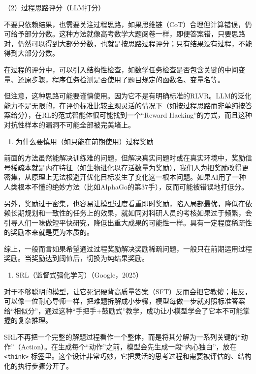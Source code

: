 （2）过程思路评分（LLM打分）

不要只依赖结果，也需要关注过程思路，如果思维链（CoT）合理但计算错误，仍可给予部分分数。这种方法就像高考数学大题阅卷一样，即便答案错，只要思路对，仍然可以得到大部分分数，也就是按思路过程评分；只有结果没有过程，不能得到大部分分数。

在过程的评分中，可以引入结构性检查，如数学任务检查是否包含关键的中间变量、还原步骤，程序任务检测是否使用了题目规定的函数名、变量名等。

但注意，这种思路可能要谨慎使用。因为它不是有明确标准的RLVR。LLM的泛化能力不是无限的，在评价标准比较主观灵活的情况下（如按过程思路而非单纯按答案给分），在RL的范式智能体很可能找到一个``Reward Hacking''的方式，而且这种对抗性样本的漏洞不可能全部被完美堵上。

\begin{enumerate}
\def\labelenumi{\arabic{enumi}.}
\setcounter{enumi}{1}
\tightlist
\item
  为什么要慎用（如只能在前期使用）过程奖励
\end{enumerate}

前面的方法虽然能解决训练难的问题，但解决真实问题时或在真实环境中，奖励信号稀疏本就是内在特征（如生物进化以存活数量为奖励），我们人为把奖励改得更密集，从原理上无法根避开优化目标发生了变化这一根本问题。如果AI用了一种人类根本不懂的绝妙方法（比如AlphaGo的第37手），反而可能被错误地打低分。

另外，奖励过于密集，也容易让模型过度看重即时奖励，陷入局部最优，降低在依赖长期规划和一致性的任务上的效果，就如同对科研人员的考核如果过于频繁，会引导人们一味做短平快研究，降低出重大成果的可能性一样。具有一定程度稀疏性的奖励本来就是更为本质的。

综上，一般而言如果希望通过过程奖励解决奖励稀疏问题，一般只在前期运用过程奖励。当奖励达到阈值后，切换为纯结果奖励。

\begin{enumerate}
\def\labelenumi{\arabic{enumi}.}
\setcounter{enumi}{1}
\tightlist
\item
  SRL（监督式强化学习）（Google，2025）
\end{enumerate}

对于不够聪明的模型，让它死记硬背高质量答案（SFT）反而会把它教傻；相反，可以像一位耐心导师一样，把难题拆解成小步骤，模型每做一步就对照标准答案给``相似分''，通过这种``手把手+鼓励式''教学，成功让小模型学会了它本不可能掌握的复杂推理。

SRL不再把一个完整的解题过程看作一个整体，而是将其分解为一系列关键的``动作''（Action）。在生成每个``动作''之前，模型会先生成一段``内心独白''，放在 \texttt{\textless{}think\textgreater{}} 标签里。这个设计非常巧妙，它把灵活的思考过程和需要被评估的、结构化的执行步骤分开了。

